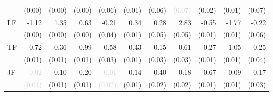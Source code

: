\begin{tabular}{lrrrrrrrrrr}
 &\tiny{(0.00)} &\tiny{(0.00)} &\tiny{(0.00)} &\tiny{(0.06)} &\tiny{(0.01)} &\tiny{(0.06)} &\cellcolor{Gray}\textcolor{LightGray}{\tiny{(0.07)}} &\tiny{(0.02)} &\tiny{(0.01)} &\tiny{(0.07)}\\[1ex]
\multirow{2}{*}{LF} &-1.12 &1.35 &0.63 &-0.21 &0.34 &0.28 &2.83 &\cellcolor{Gray}-0.55 &-1.77 &-0.22\\
 &\tiny{(0.00)} &\tiny{(0.00)} &\tiny{(0.00)} &\tiny{(0.04)} &\tiny{(0.01)} &\tiny{(0.05)} &\tiny{(0.05)} &\cellcolor{Gray}\tiny{(0.01)} &\tiny{(0.01)} &\tiny{(0.06)}\\[1ex]
\multirow{2}{*}{TF} &-0.72 &0.36 &0.99 &0.58 &0.43 &-0.15 &0.61 &-0.27 &\cellcolor{Gray}-1.05 &-0.25\\
 &\tiny{(0.01)} &\tiny{(0.01)} &\tiny{(0.01)} &\tiny{(0.03)} &\tiny{(0.01)} &\tiny{(0.03)} &\tiny{(0.03)} &\tiny{(0.01)} &\cellcolor{Gray}\tiny{(0.01)} &\tiny{(0.04)}\\[1ex]
\multirow{2}{*}{JF} &\textcolor{LightGray}{0.02} &-0.10 &-0.20 &\textcolor{LightGray}{0.01} &0.14 &0.40 &-0.18 &-0.67 &-0.09 &\cellcolor{Gray}0.17\\
 &\textcolor{LightGray}{\tiny{(0.01)}} &\tiny{(0.01)} &\tiny{(0.01)} &\textcolor{LightGray}{\tiny{(0.02)}} &\tiny{(0.01)} &\tiny{(0.02)} &\tiny{(0.02)} &\tiny{(0.01)} &\tiny{(0.01)} &\cellcolor{Gray}\tiny{(0.03)}\\[1ex]
\bottomrule
\end{tabular}
